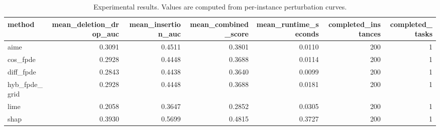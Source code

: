 \begin{table}[t]
\caption{Experimental results. Values are computed from per-instance perturbation curves.}
\label{tab:main_results_computed}
\centering
\begin{tabular}{lrrrrrr}
\toprule
method & mean\_deletion\_drop\_auc & mean\_insertion\_auc & mean\_combined\_score & mean\_runtime\_seconds & completed\_instances & completed\_tasks \\
\midrule
aime & 0.3091 & 0.4511 & 0.3801 & 0.0110 & 200 & 1 \\
cos\_fpde & 0.2928 & 0.4448 & 0.3688 & 0.0114 & 200 & 1 \\
diff\_fpde & 0.2843 & 0.4438 & 0.3640 & 0.0099 & 200 & 1 \\
hyb\_fpde\_grid & 0.2928 & 0.4448 & 0.3688 & 0.0181 & 200 & 1 \\
lime & 0.2058 & 0.3647 & 0.2852 & 0.0305 & 200 & 1 \\
shap & 0.3930 & 0.5699 & 0.4815 & 0.3727 & 200 & 1 \\
\bottomrule
\end{tabular}

\end{table}
